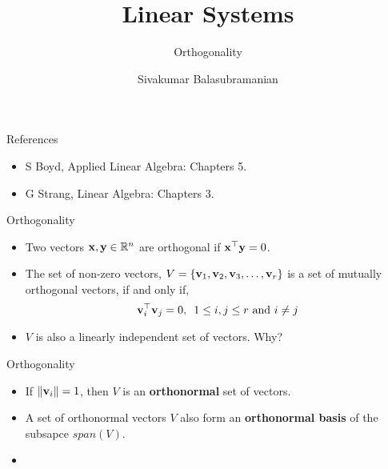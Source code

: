 \documentclass[aspectratio=169]{beamer}
\title{Linear Systems}
\subtitle{Orthogonality}
\author{Sivakumar Balasubramanian}
\institute[Christian Medical College] %
{
  \inst{}%
  Department of Bioengineering\\
  Christian Medical College, Bagayam\\
  Vellore 632002
}
\date{}
\let\olditem\item
\renewcommand{\item}{\setlength{\itemsep}{\fill}\olditem}
\def\mf{\ensuremath\mathbf}
\def\mb{\ensuremath\mathbb}
\def\lV{\ensuremath\left\lVert}
\def\rV{\ensuremath\right\rVert}
\begin{document}
\begin{frame}
  \titlepage
\end{frame}

\begin{frame}[t]{References}
\begin{itemize}
    \item S Boyd, Applied Linear Algebra: Chapters 5.
    \item G Strang, Linear Algebra: Chapters 3.
\end{itemize}
\end{frame}


\begin{frame}[t]{Orthogonality}
\begin{itemize}
\item Two vectors $\mf{x}, \mf{y} \in \mb{R}^n$ are orthogonal if $\mf{x}^\top\mf{y} = 0$.
\begin{center}
\end{center}

\item The set of non-zero vectors, $V = \left\{\mf{v}_1, \mf{v}_2, \mf{v}_3, \ldots, \mf{v}_r\right\}$ is a set of mutually orthogonal vectors, if and only if,
$$\mf{v}_i^\top\mf{v}_j = 0, \,\,\, 1 \leq i, j \leq r \text{ and } i \neq j$$

\item $V$ is also a linearly independent set of vectors. Why?

\end{itemize}
\end{frame}


\begin{frame}[t]{Orthogonality}
\begin{itemize}

\item If $\lV \mf{v}_i \rV = 1$, then $V$ is an \textbf{orthonormal} set of vectors.

\item A set of orthonormal vectors $V$ also form an \textbf{orthonormal basis} of the subsapce $span \left(V\right)$.

\item {}

\end{itemize}
\end{frame}
\end{document}

